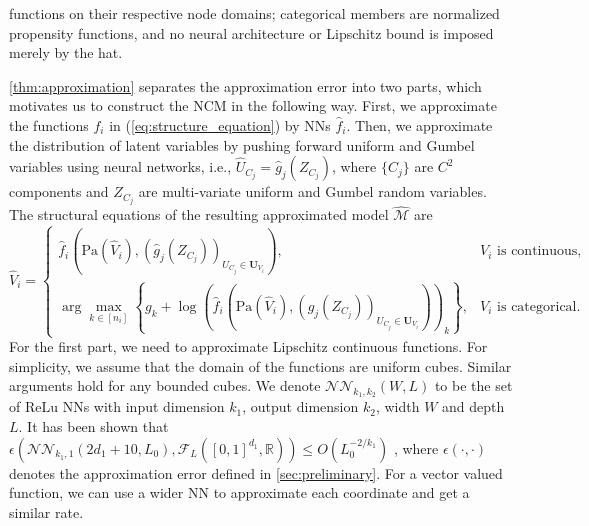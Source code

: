 \documentclass[12pt]{article}
\theoremstyle{plain}
\theoremstyle{definition}
\theoremstyle{remark}
\begin{document}
functions on their respective node domains; categorical members are normalized propensity functions, and no neural architecture or Lipschitz bound is imposed merely by the hat.


\cref{thm:approximation} separates the approximation error into two parts, which motivates us to construct the NCM in the following way. First, we approximate the functions $ f_i $ in (\ref{eq:structure_equation}) by NNs $ \hat{f}_i $. Then, we approximate the distribution of latent variables by pushing forward uniform and Gumbel variables using neural networks, i.e.,  $ \hat{U}_{C_j}=\hat{g}_j(Z_{C_j}) $, where $\{C_j\}$ are $C^2$ components and $Z_{C_j}$ are multi-variate uniform and Gumbel random variables. The structural equations of the resulting approximated model $ \hat{\mathcal{M}} $ are
\begin{equation}\label{eq:structure_equation_hat}
  \hat{V}_{i} =\begin{cases}
\hat{f}_{i}\left(\text{Pa} (\hat{V}_{i} ),(\hat{g}_{j} (Z_{C_{j}} ))_{U_{C_{j} }\in \boldsymbol{U}_{V_{i}}}\right), & V_{i}  \text{ is continuous} ,\\
\arg\max_{k\in [ n_{i}]}\left\{g_{k} +\log\left(\hat{f}_{i}\left(\text{Pa} (\hat{V}_{i} ),(\hat{g}_{j} (Z_{C_{j}} ))_{U_{C_{j} } \in \boldsymbol{U}_{V_{i}}}\right)  \right)_{k}\right\} , & V_{i}  \text{ is categorical}.
\end{cases}
\end{equation}
For the first part, we need to approximate Lipschitz continuous functions. For simplicity, we assume that the domain of the functions are uniform cubes. Similar arguments hold for any bounded cubes. We denote $ \mathcal{NN}_{k_1,k_2}(W,L) $ to be the set of ReLu NNs with input dimension $ k_1 $, output dimension $ k_2 $, width $ W $ and depth $ L $. It has been shown that  $\epsilon (\mathcal{NN}_{k_1,1}(2d_1+10,L_0) ,\mathcal{F}_{L}([0,1]^{d_1},\mathbb{R})) \leqslant O(L_0^{-{2}/{k_1}})$ \cite{Yarotsky2018OptimalAO}, where $\epsilon(\cdot,\cdot)$ denotes the approximation error defined in \cref{sec:preliminary}. 
For a vector valued function, we can use a wider NN to approximate each coordinate and get a similar rate.\par
\end{document}
